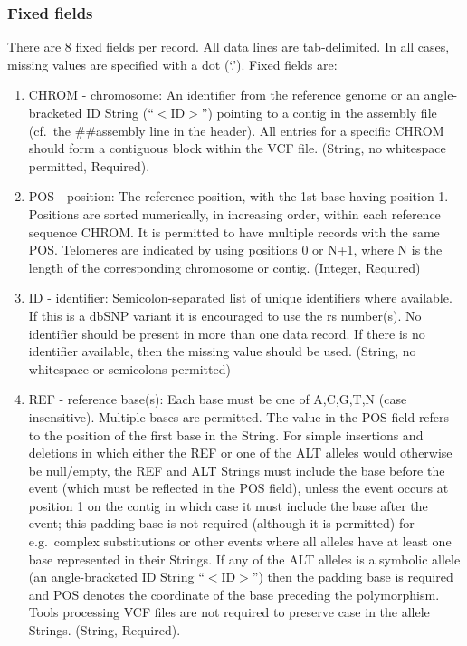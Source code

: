 \documentclass[8pt]{article}
\begin{document}
\subsubsection{Fixed fields}
There are 8 fixed fields per record. All data lines are tab-delimited. In all cases, missing values are specified with a dot (`.'). Fixed fields are:

\begin{enumerate}
  \item CHROM - chromosome: An identifier from the reference genome or an angle-bracketed ID String (``$<$ID$>$'') pointing to a contig in the assembly file (cf.\ the \#\#assembly line in the header). All entries for a specific CHROM should form a contiguous block within the VCF file. (String, no whitespace permitted, Required).
  \item POS - position: The reference position, with the 1st base having position 1. Positions are sorted numerically, in increasing order, within each reference sequence CHROM.   It is permitted to have multiple records with the same POS. Telomeres are indicated by using positions 0 or N+1, where N is the length of the corresponding chromosome or contig.   (Integer, Required)
  \item ID - identifier: Semicolon-separated list of unique identifiers where available. If this is a dbSNP variant it is encouraged to use the rs number(s). No identifier should be present in more than one data record. If there is no identifier available, then the missing value should be used. (String, no whitespace or semicolons permitted)
  \item REF - reference base(s): Each base must be one of A,C,G,T,N (case insensitive). Multiple bases are permitted. The value in the POS field refers to the position of the first base in the String. For simple insertions and deletions in which either the REF or one of the ALT alleles would otherwise be null/empty, the REF and ALT Strings must include the base before the event (which must be reflected in the POS field), unless the event occurs at position 1 on the contig in which case it must include the base after the event; this padding base is not required (although it is permitted) for e.g.\ complex substitutions or other events where all alleles have at least one base represented in their Strings.  If any of the ALT alleles is a symbolic allele (an angle-bracketed ID String ``$<$ID$>$'') then the padding base is required and POS denotes the coordinate of the base preceding the polymorphism. Tools processing VCF files are not required to preserve case in the allele Strings. (String, Required).

\end{enumerate}
\end{document}
